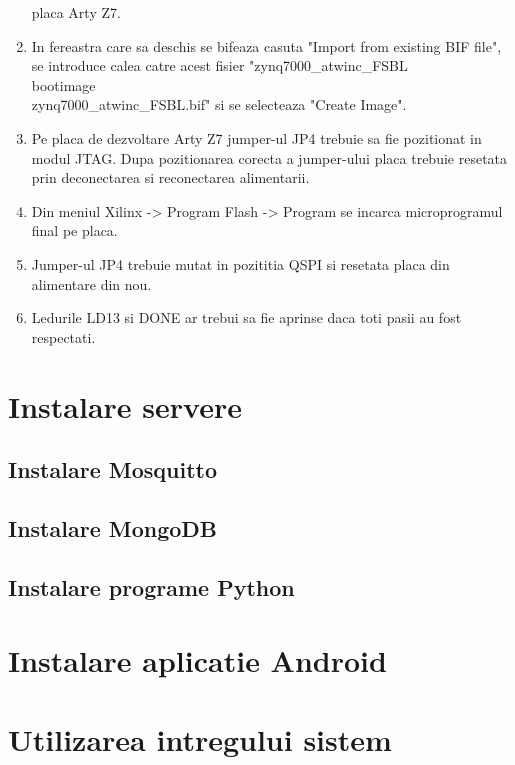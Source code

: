 \begin{enumerate}
    placa Arty Z7.
    \item In fereastra care sa deschis se bifeaza casuta "Import from existing BIF file", se introduce calea catre acest fisier 
    "zynq7000\_atwinc\_FSBL\\bootimage\\zynq7000\_atwinc\_FSBL.bif" si se selecteaza "Create Image".
    \item Pe placa de dezvoltare Arty Z7 jumper-ul JP4 trebuie sa fie pozitionat in modul JTAG. Dupa pozitionarea corecta a jumper-ului placa trebuie resetata prin deconectarea 
    si reconectarea alimentarii.
    \item Din meniul Xilinx -> Program Flash -> Program se incarca microprogramul final pe placa.
    \item Jumper-ul JP4 trebuie mutat in pozititia QSPI si resetata placa din alimentare din nou.
    \item Ledurile LD13 si DONE ar trebui sa fie aprinse daca toti pasii au fost respectati.
\end{enumerate}

\section{Instalare servere}\label{sec:iu_instalare_servere}
\subsection{Instalare Mosquitto}\label{subsec:iu_instalare_mosquitto}
\subsection{Instalare MongoDB}\label{subsec:iu_instalare_mongoDB}
\subsection{Instalare programe Python}\label{subsec:iu_instalare_python}
\section{Instalare aplicatie Android}\label{sec:iu_instalare_app_android}
\section{Utilizarea intregului sistem}\label{sec:iu_utilizare_sistem}
